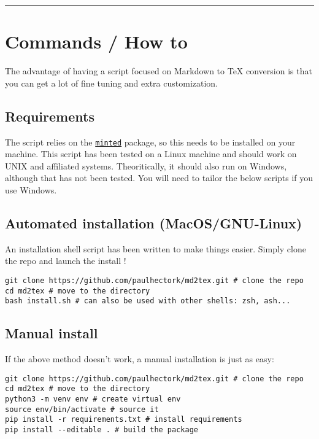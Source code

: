 \documentclass[a4paper, 12pt, twoside]{book}
\begin{document}
\par\noindent\rule{\linewidth}{0.4pt}
\section*{Commands / How to}

The advantage of having a script focused on Markdown to TeX conversion is that you can get a lot of fine tuning
and extra customization.
\subsection*{Requirements}

The script relies on the \href{http://tug.ctan.org/macros/latex/contrib/minted/minted.pdf}{\texttt{minted}} package,
so this needs to be installed on your machine. This script has been tested on a Linux machine and should
work on UNIX and affiliated systems. Theoritically, it should also run on Windows, although that has not
been tested. You will need to tailor the below scripts if you use Windows.
\subsection*{Automated installation (MacOS/GNU-Linux)}

An installation shell script has been written to make things easier.
Simply clone the repo and launch the install !

\begin{listing}[h!]
   \begin{verbatim}
git clone https://github.com/paulhectork/md2tex.git # clone the repo
cd md2tex # move to the directory
bash install.sh # can also be used with other shells: zsh, ash...

   \end{verbatim}
\end{listing}
\subsection*{Manual install}

If the above method doesn't work, a manual installation is just as easy:

\begin{listing}[h!]
   \begin{verbatim}
git clone https://github.com/paulhectork/md2tex.git # clone the repo
cd md2tex # move to the directory
python3 -m venv env # create virtual env
source env/bin/activate # source it
pip install -r requirements.txt # install requirements
pip install --editable . # build the package

   \end{verbatim}
\end{listing}
\end{document}
